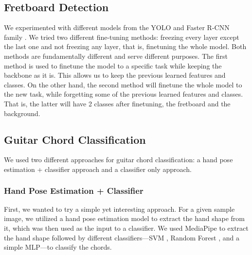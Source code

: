 \documentclass[10pt,twocolumn,letterpaper]{article}
\begin{document}
\subsection{Fretboard Detection}
We experimented with different models from the YOLO \cite{redmon2016you} and Faster R-CNN family \cite{ren2016faster}. We tried two different fine-tuning methods: freezing every layer except the last one and not freezing any layer, that is, finetuning the whole model. Both methods are fundamentally different and serve different purposes. The first method is used to finetune the model to a specific task while keeping the backbone as it is. This allows us to keep the previous learned features and classes. On the other hand, the second method will finetune the
whole model to the new task, while forgetting some of the previous learned features and classes. That is, the latter will have 2 classes after finetuning, the fretboard and the background.


\subsection{Guitar Chord Classification}
We used two different approaches for guitar chord classification: a hand pose estimation + classifier approach and a classifier only approach.

\subsubsection{Hand Pose Estimation + Classifier}
First, we wanted to try a simple yet interesting approach. For a given sample image, we utilized a hand pose estimation model to extract the hand shape from it, which was then used as the input to a classifier. We used MediaPipe to extract the hand shape followed by different classifiers—SVM \cite{cortes1995support}, Random Forest \cite{ho1995random}, and a simple MLP—to classify the chords.

\end{document}
